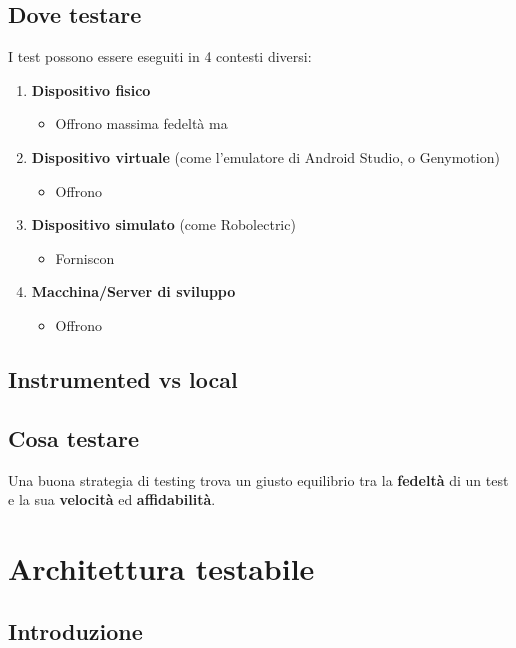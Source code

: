 \subsection{Dove testare}
\par I test possono essere eseguiti in 4 contesti diversi:
\begin{enumerate}
    \item \textbf{Dispositivo fisico}
    \begin{itemize}
        \item Offrono massima fedeltà ma
    \end{itemize}
    \item \textbf{Dispositivo virtuale} (come l'emulatore di Android Studio, o Genymotion)
    \begin{itemize}
        \item Offrono 
    \end{itemize}
    \item \textbf{Dispositivo simulato} (come Robolectric)
    \begin{itemize}
        \item Forniscon 
    \end{itemize}
    \item \textbf{Macchina/Server di sviluppo}
    \begin{itemize}
        \item Offrono 
    \end{itemize}
\end{enumerate}

\subsection{Instrumented vs local}



\subsection{Cosa testare}
\par Una buona strategia di testing trova un giusto equilibrio tra la \textbf{fedeltà} di un test e la sua \textbf{velocità} ed \textbf{affidabilità}.

\section{Architettura testabile}
\subsection{Introduzione}

